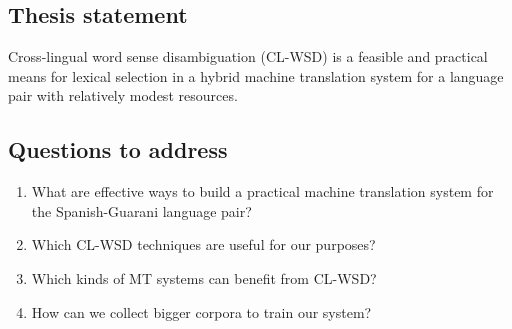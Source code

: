 \subsection{Thesis statement}
Cross-lingual word sense disambiguation (CL-WSD) is a feasible and practical
means for lexical selection in a hybrid machine translation system for a
language pair with relatively modest resources.

\subsection{Questions to address}
\begin{enumerate}
\item What are effective ways to build a practical machine translation system
for the Spanish-Guarani language pair?
\item Which CL-WSD techniques are useful for our purposes?
\item Which kinds of MT systems can benefit from CL-WSD?
\item How can we collect bigger corpora to train our system?
\end{enumerate}

